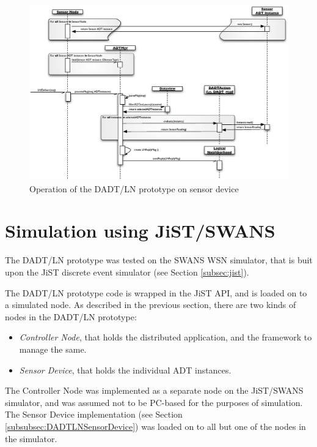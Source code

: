 \begin{figure}
\centering
\label{Fig:SeqDiagram_Sensornode}
\includegraphics[width=\textwidth]{img/SeqDiagram_Sensornode.eps}
\caption[Operation of the DADT/LN prototype on sensor device]{Operation of the DADT/LN prototype on sensor device}
\end{figure}


\section{Simulation using JiST/SWANS}

The DADT/LN prototype was tested on the SWANS WSN simulator, that is buit upon
the JiST discrete event simulator (see Section \ref{subsec:jist}). 

The DADT/LN prototype code is wrapped in the JiST API, and is loaded on to a
simulated node. As described in the previous section, there are two kinds of
nodes in the DADT/LN prototype:

\begin{itemize}
  \item \emph{Controller Node}, that holds the distributed application, and the
  framework to manage the same.
  \item \emph{Sensor Device}, that holds the individual ADT instances. 
\end{itemize}

The Controller Node was implemented as a separate node on the JiST/SWANS
simulator, and was assumed not to be PC-based for the purposes of simulation.
The Sensor Device implementation (see Section
\ref{subsubsec:DADTLNSensorDevice}) was loaded on to all but one of the nodes in
the simulator.

